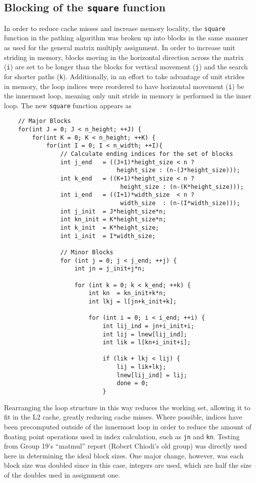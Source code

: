 \documentclass[11pt]{article}
\begin{document}
\subsection{Blocking of the \texttt{square} function}
\noindent In order to reduce cache misses and increase memory locality, the \texttt{square} function in the pathing algorithm was broken up into blocks in the same manner as used for the general matrix multiply assignment. In order to increase unit striding in memory, blocks moving in the horizontal direction across the matrix (\texttt{i}) are set to be longer than the blocks for vertical movement (\texttt{j}) and the search for shorter paths (\texttt{k}). Additionally, in an effort to take advantage of unit strides in memory, the loop indices were reordered to have horizontal movement (\texttt{i}) be the innermost loop, meaning only unit stride in memory is performed in the inner loop. The new \texttt{square} function appears as
\begin{lstlisting}
    // Major Blocks
    for(int J = 0; J < n_height; ++J) {
	    for(int K = 0; K < n_height; ++K) {
		    for(int I = 0; I < n_width; ++I){
			    // Calculate ending indices for the set of blocks
			    int j_end   = ((J+1)*height_size < n ? 
							    height_size : (n-(J*height_size)));
			    int k_end   = ((K+1)*height_size < n ?
							     height_size : (n-(K*height_size)));
			    int i_end   = ((I+1)*width_size  < n ?
							     width_size  : (n-(I*width_size)));
			    int j_init  = J*height_size*n;
			    int kn_init = K*height_size*n;
			    int k_init  = K*height_size;
			    int i_init  = I*width_size;
    
			    // Minor Blocks
			    for (int j = 0; j < j_end; ++j) {
				    int jn = j_init+j*n;
    
				    for (int k = 0; k < k_end; ++k) {
					    int kn  = kn_init+k*n;
					    int lkj = l[jn+k_init+k];
    
					    for (int i = 0; i < i_end; ++i) {
						    int lij_ind = jn+i_init+i;
						    int lij = lnew[lij_ind];
						    int lik = l[kn+i_init+i];
    
						    if (lik + lkj < lij) {
							    lij = lik+lkj;
							    lnew[lij_ind] = lij;
							    done = 0;
						    }
\end{lstlisting}
\noindent Rearranging the loop structure in this way reduces the working set, allowing it to fit in the L2 cache, greatly reducing cache misses. Where possible, indices have been precomputed outside of the innermost loop in order to reduce the amount of floating point operations used in index calculation, such as \texttt{jn} and \texttt{kn}. Testing from Group 19's ``matmul'' report (Robert Chiodi's old group) was directly used here in determining the ideal block sizes. One major change, however, was each block size was doubled since in this case, integers are used, which are half the size of the doubles used in assignment one. \\
\end{document}
